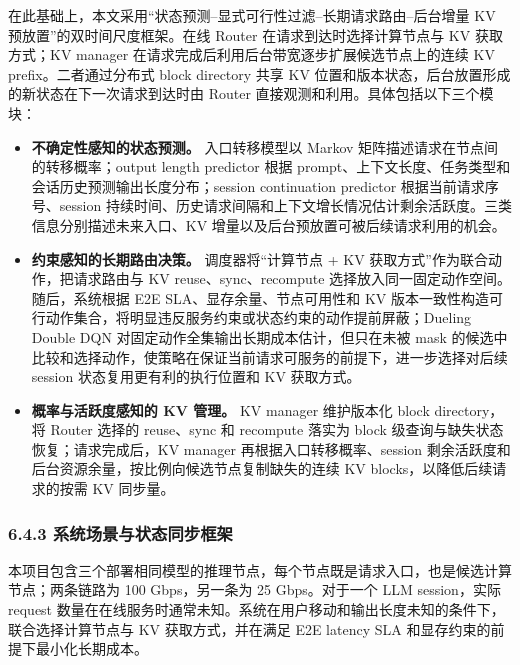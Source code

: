 在此基础上，本文采用“状态预测--显式可行性过滤--长期请求路由--后台增量 KV 预放置”的双时间尺度框架。在线 Router 在请求到达时选择计算节点与 KV 获取方式；KV manager 在请求完成后利用后台带宽逐步扩展候选节点上的连续 KV prefix。二者通过分布式 block directory 共享 KV 位置和版本状态，后台放置形成的新状态在下一次请求到达时由 Router 直接观测和利用。具体包括以下三个模块：
\begin{itemize}
    \item \textbf{不确定性感知的状态预测。} 入口转移模型以 Markov 矩阵描述请求在节点间的转移概率；output length predictor 根据 prompt、上下文长度、任务类型和会话历史预测输出长度分布；session continuation predictor 根据当前请求序号、session 持续时间、历史请求间隔和上下文增长情况估计剩余活跃度。三类信息分别描述未来入口、KV 增量以及后台预放置可被后续请求利用的机会。
    \item \textbf{约束感知的长期路由决策。} 调度器将“计算节点 + KV 获取方式”作为联合动作，把请求路由与 KV reuse、sync、recompute 选择放入同一固定动作空间。随后，系统根据 E2E SLA、显存余量、节点可用性和 KV 版本一致性构造可行动作集合，将明显违反服务约束或状态约束的动作提前屏蔽；Dueling Double DQN 对固定动作全集输出长期成本估计，但只在未被 mask 的候选中比较和选择动作，使策略在保证当前请求可服务的前提下，进一步选择对后续 session 状态复用更有利的执行位置和 KV 获取方式。
    \item \textbf{概率与活跃度感知的 KV 管理。} KV manager 维护版本化 block directory，将 Router 选择的 reuse、sync 和 recompute 落实为 block 级查询与缺失状态恢复；请求完成后，KV manager 再根据入口转移概率、session 剩余活跃度和后台资源余量，按比例向候选节点复制缺失的连续 KV blocks，以降低后续请求的按需 KV 同步量。
\end{itemize}

\subsubsection*{6.4.3 系统场景与状态同步框架}

本项目包含三个部署相同模型的推理节点，每个节点既是请求入口，也是候选计算节点；两条链路为 100 Gbps，另一条为 25 Gbps。对于一个 LLM session，实际 request 数量在在线服务时通常未知。系统在用户移动和输出长度未知的条件下，联合选择计算节点与 KV 获取方式，并在满足 E2E latency SLA 和显存约束的前提下最小化长期成本。

